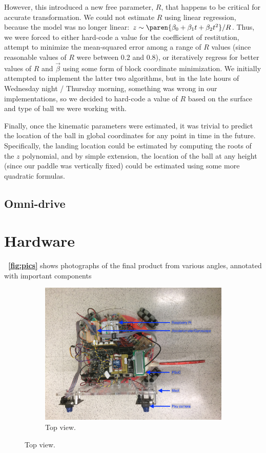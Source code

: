 \documentclass[letterpaper, 11pt]{article}
\newcommand*{\figref}[1]{\textbf{\figurename~\ref{#1}}}
\renewcommand{\v}[1]{\vec{#1}}
\begin{document}
\begin{enumerate}[label=\textbf{\arabic*.}]
However, this introduced a new free parameter, $R$, that happens to be critical for accurate transformation. We could not estimate $R$ using linear regression, because the model was no longer linear: $z \sim \paren{\beta_0 + \beta_1 t + \beta_2 t^2} / R$. Thus, we were forced to either hard-code a value for the coefficient of restitution, attempt to minimize the mean-squared error among a range of $R$ values (since reasonable values of $R$ were between $0.2$ and $0.8$), or iteratively regress for better values of $R$ and $\v{\beta}$ using some form of block coordinate minimization. We initially attempted to implement the latter two algorithms, but in the late hours of Wednesday night / Thursday morning, something was wrong in our implementations, so we decided to hard-code a value of $R$ based on the surface and type of ball we were working with.

Finally, once the kinematic parameters were estimated, it was trivial to predict the location of the ball in global coordinates for any point in time in the future. Specifically, the landing location could be estimated by computing the roots of the $z$ polynomial, and by simple extension, the location of the ball at any height (since our paddle was vertically fixed) could be estimated using some more quadratic formulas.

\subsection{Omni-drive}

\clearpage
\section{Hardware}
\figref{fig:pics} shows photographs of the final product from various angles, annotated with important components
\begin{figure}[H]
    \centering
    \begin{subfigure}[t]{0.8\textwidth}
        \includegraphics[width=\textwidth]{images/top.JPG}
        \caption{Top view.}
    \end{subfigure}


\end{figure}
\end{enumerate}
\end{document}

